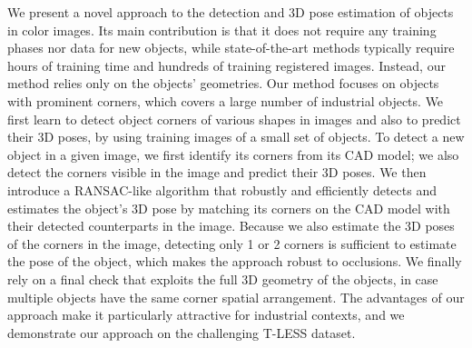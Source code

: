 We present a novel approach to the detection and 3D pose estimation of objects in color images. Its main contribution is that it does not require any training phases nor data for new objects, while state-of-the-art methods typically require hours of training time and hundreds of training registered images. Instead, our method relies only on the objects' geometries. Our method focuses on objects with prominent corners, which covers a large number of industrial objects. We first learn to detect object corners of various shapes in images and also to predict their 3D poses, by using training images of a small set of objects. To detect a new object in a given image, we first identify its corners from its CAD model; we also detect the corners visible in the image and predict their 3D poses. We then introduce a RANSAC-like algorithm that robustly and efficiently detects and estimates the object's 3D pose by matching its corners on the CAD model with their detected counterparts in the image. Because we also estimate the 3D poses of the corners in the image, detecting only 1 or 2 corners is sufficient to estimate the pose of the object, which makes the approach robust to occlusions. We finally rely on a final check that exploits the full 3D geometry of the objects, in case multiple objects have the same corner spatial arrangement. The advantages of our approach make it particularly attractive for industrial contexts, and we demonstrate our approach on the challenging T-LESS dataset.
